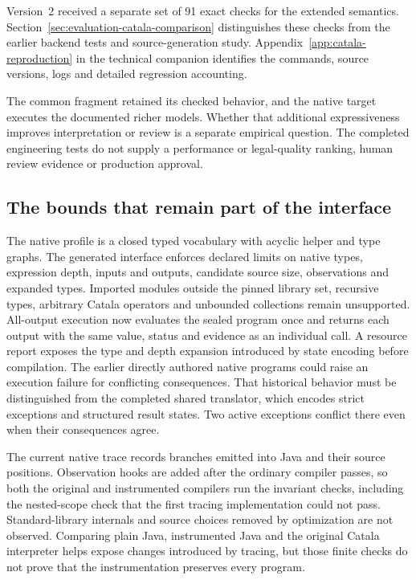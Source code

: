\documentclass[12pt,a4paper,oneside,openany]{book}
\begin{document}
Version~2 received a separate set of 91 exact checks for the extended semantics.
Section~\ref{sec:evaluation-catala-comparison} distinguishes these checks from
the earlier backend tests and source-generation study.
Appendix~\ref{app:catala-reproduction} in the technical companion identifies
the commands, source versions, logs and detailed regression accounting.

The common fragment retained its checked behavior, and the native target
executes the documented richer models. Whether that additional expressiveness
improves interpretation or review is a separate empirical question. The
completed engineering tests do not supply a performance or legal-quality
ranking, human review evidence or production approval.

\subsection{The bounds that remain part of the interface}
\label{sec:implementation-catala-bounds}

The native profile is a closed typed vocabulary with acyclic helper and type
graphs. The generated interface enforces declared limits on native types,
expression depth, inputs and outputs, candidate source size, observations and
expanded types. Imported modules outside the pinned library set, recursive
types, arbitrary Catala operators and unbounded collections remain unsupported.
All-output execution now evaluates the sealed program once and returns each
output with the same value, status and evidence as an individual call. A resource
report exposes the type and depth expansion introduced by state encoding before
compilation. The earlier directly
authored native programs could raise an execution failure for conflicting
consequences. That historical behavior must be distinguished from the completed
shared translator, which encodes strict exceptions and structured result states.
Two active exceptions conflict there even when their consequences agree.

The current native trace records branches emitted into Java and their source
positions. Observation hooks are added after the ordinary compiler passes, so
both the original and instrumented compilers run the invariant checks, including
the nested-scope check that the first tracing implementation could not pass.
Standard-library internals and source choices removed by optimization are not
observed. Comparing plain Java, instrumented Java and the original Catala
interpreter helps expose changes introduced by tracing, but those finite checks
do not prove that the instrumentation preserves every program.
\end{document}
